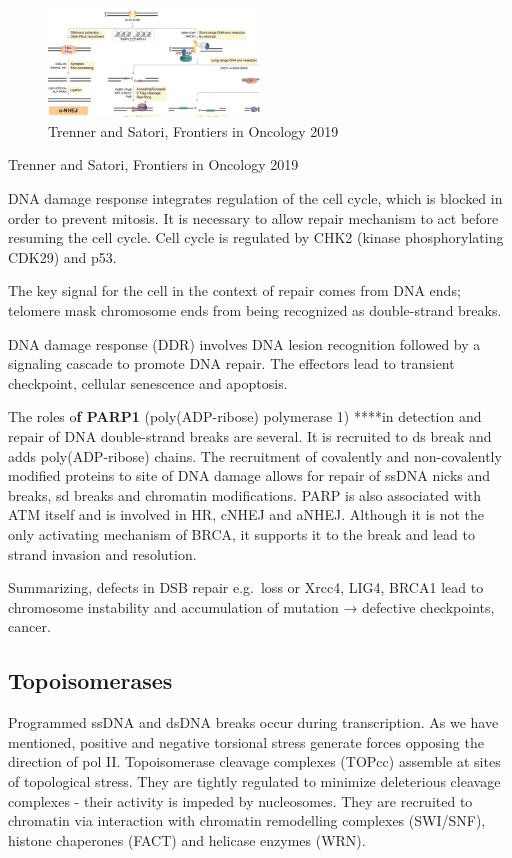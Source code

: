 \begin{figure}
\centering
\includegraphics[width=0.5\textwidth]{../_resources/Picture1.jpg}
\caption{Trenner and Satori, Frontiers in Oncology 2019}
\end{figure}

Trenner and Satori, Frontiers in Oncology 2019

DNA damage response integrates regulation of the cell cycle, which is blocked in order to prevent mitosis. It is necessary to allow repair mechanism to act before resuming the cell cycle. Cell cycle is regulated by CHK2 (kinase phosphorylating CDK29) and p53.

The key signal for the cell in the context of repair comes from DNA ends; telomere mask chromosome ends from being recognized as double-strand breaks.

DNA damage response (DDR) involves DNA lesion recognition followed by a signaling cascade to promote DNA repair. The effectors lead to transient checkpoint, cellular senescence and apoptosis.

The roles o\textbf{f PARP1} (poly(ADP-ribose) polymerase 1) ****in detection and repair of DNA double-strand breaks are several. It is recruited to ds break and adds poly(ADP-ribose) chains. The recruitment of covalently and non-covalently modified proteins to site of DNA damage allows for repair of ssDNA nicks and breaks, sd breaks and chromatin modifications. PARP is also associated with ATM itself and is involved in HR, cNHEJ and aNHEJ. Although it is not the only activating mechanism of BRCA, it supports it to the break and lead to strand invasion and resolution.

Summarizing, defects in DSB repair e.g.~loss or Xrcc4, LIG4, BRCA1 lead to chromosome instability and accumulation of mutation → defective checkpoints, cancer.

\hypertarget{topoisomerases}{%
\subsection{Topoisomerases}\label{topoisomerases}}

Programmed ssDNA and dsDNA breaks occur during transcription. As we have mentioned, positive and negative torsional stress generate forces opposing the direction of pol II. Topoisomerase cleavage complexes (TOPcc) assemble at sites of topological stress. They are tightly regulated to minimize deleterious cleavage complexes - their activity is impeded by nucleosomes. They are recruited to chromatin via interaction with chromatin remodelling complexes (SWI/SNF), histone chaperones (FACT) and helicase enzymes (WRN).

